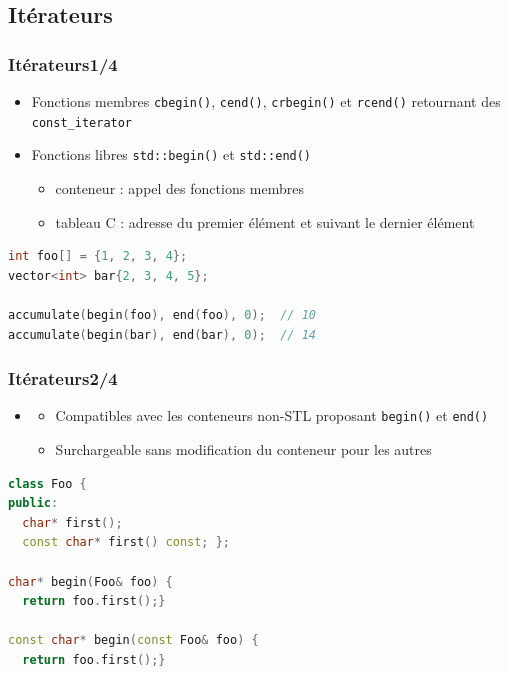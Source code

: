 \documentclass[C++.tex]{subfiles}
\begin{document}
\subsection*{Itérateurs}
\begin{frame}[fragile]
	\frametitle{Itérateurs\titlehfill{}1/4}
	\begin{itemize}
		\item Fonctions membres \lstinline|cbegin()|, \lstinline|cend()|, \lstinline|crbegin()| et \lstinline|rcend()| retournant des \lstinline|const_iterator|


		\item Fonctions libres \lstinline|std::begin()| et \lstinline|std::end()|
		\begin{itemize}
			\item conteneur : appel des fonctions membres
			\item tableau C : adresse du premier élément et suivant le dernier élément
		\end{itemize}
	\end{itemize}

	\begin{lstlisting}[language=C++]
int foo[] = {1, 2, 3, 4};
vector<int> bar{2, 3, 4, 5};

accumulate(begin(foo), end(foo), 0);  // 10
accumulate(begin(bar), end(bar), 0);  // 14\end{lstlisting}
\end{frame}

\begin{frame}[fragile]
	\frametitle{Itérateurs\titlehfill{}2/4}
	\begin{itemize}
		\item [] \begin{itemize}
			\item Compatibles avec les conteneurs non-STL proposant \lstinline|begin()| et \lstinline|end()|
			\item Surchargeable sans modification du conteneur pour les autres

		\end{itemize}
	\end{itemize}

	\begin{lstlisting}[language=C++]
class Foo {
public:
  char* first();
  const char* first() const; };

char* begin(Foo& foo) {
  return foo.first();}

const char* begin(const Foo& foo) {
  return foo.first();}\end{lstlisting}
\end{frame}
\end{document}
